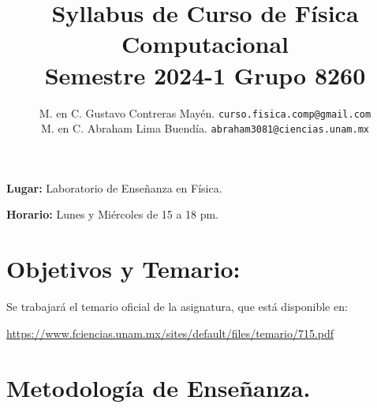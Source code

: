 

\author{M. en C. Gustavo Contreras Mayén. \texttt{curso.fisica.comp@gmail.com}\\
M. en C. Abraham Lima Buendía. \texttt{abraham3081@ciencias.unam.mx}}
\title{Syllabus de Curso de Física Computacional \\ {\large Semestre 2024-1 Grupo 8260}}
\date{ }

\usepackage[backend=biber, style=ieee, sorting=ynt]{biblatex}





\renewcommand\labelenumii{\theenumi.{\arabic{enumii}}}
\maketitle
\fontsize{12}{12}\selectfont

\textbf{Lugar: } Laboratorio de Enseñanza en Física.
\par
\textbf{Horario: } Lunes y Miércoles de 15 a 18 pm.
\par
\par
\section{Objetivos y Temario:}

Se trabajará el temario oficial de la asignatura, que está disponible en:

\href{https://www.fciencias.unam.mx/sites/default/files/temario/715.pdf}{https://www.fciencias.unam.mx/sites/default/files/temario/715.pdf}

\section{Metodología de Enseñanza.}

